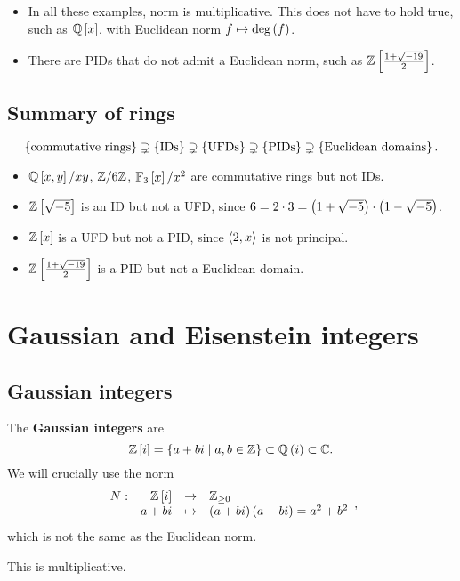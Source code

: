 \begin{remark*}
\hfill
\begin{itemize}
\item In all these examples, norm is multiplicative. This does not have to hold true, such as $ \mathbb{Q}\left[ x \right] $, with Euclidean norm $ f \mapsto \deg\left( f \right) $.
\item There are PIDs that do not admit a Euclidean norm, such as $ \mathbb{Z}\left[ \tfrac{1 + \sqrt{-19}}{2} \right] $.
\end{itemize}
\end{remark*}

\subsection{Summary of rings}

$$ \left\{ \text{commutative rings} \right\} \supsetneq \left\{ \text{IDs} \right\} \supsetneq \left\{ \text{UFDs} \right\} \supsetneq \left\{ \text{PIDs} \right\} \supsetneq \left\{ \text{Euclidean domains} \right\}. $$
\begin{itemize}
\item $ \mathbb{Q}\left[ x, y \right] / xy $, $ \mathbb{Z} / 6\mathbb{Z} $, $ \mathbb{F}_3\left[ x \right] / x^2 $ are commutative rings but not IDs.
\item $ \mathbb{Z}\left[ \sqrt{-5} \right] $ is an ID but not a UFD, since $ 6 = 2 \cdot 3 = \left( 1 + \sqrt{-5} \right) \cdot \left( 1 - \sqrt{-5} \right) $.
\item $ \mathbb{Z}\left[ x \right] $ is a UFD but not a PID, since $ \left\langle 2, x \right\rangle $ is not principal.
\item $ \mathbb{Z}\left[ \tfrac{1 + \sqrt{-19}}{2} \right] $ is a PID but not a Euclidean domain.
\end{itemize}

\pagebreak

\section{Gaussian and Eisenstein integers}

\subsection{Gaussian integers}

The \textbf{Gaussian integers} are
$$ \mathbb{Z}\left[ i \right] = \left\{ a + bi \mid a, b \in \mathbb{Z} \right\} \subset \mathbb{Q}\left( i \right) \subset \mathbb{C}. $$
We will crucially use the norm
$$ \function[N]{\Z\sb{i}}{\Z_{\ge 0}}{a + bi}{\rb{a + bi}\rb{a - bi} = a^2 + b^2}, $$
which is not the same as the Euclidean norm.

\begin{note*}
This is multiplicative.
\end{note*}

